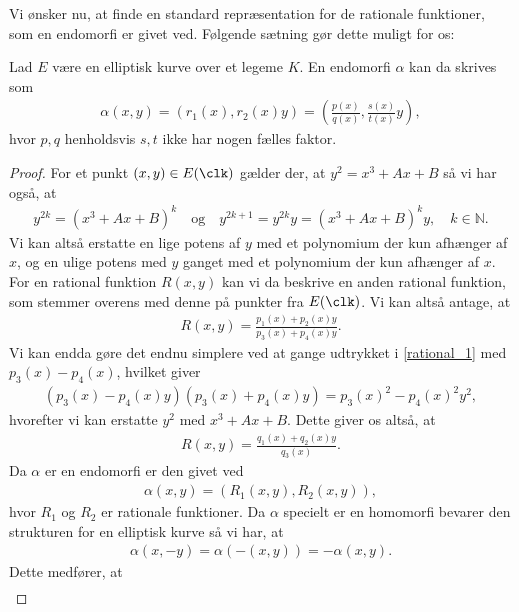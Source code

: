 Vi ønsker nu, at finde en standard repræsentation for de rationale funktioner, som en endomorfi er givet ved. Følgende sætning gør dette muligt for os:

\begin{thm}
\label{end_rep_theorem}
Lad $E$ være en elliptisk kurve over et legeme $K$. En endomorfi $\alpha$ kan da skrives som
\begin{align*}
	\alpha(x, y) = (r_1(x), r_2(x)y) = \left( \frac{p(x)}{q(x)}, \frac{s(x)}{t(x)}y \right),
\end{align*}
hvor $p, q$ henholdsvis $s, t$ ikke har nogen fælles faktor.
\end{thm}
\begin{proof}
For et punkt $(x, y) \in E(\clk)$ gælder der, at $y^2 = x^3 + Ax + B$ så vi har også, at 
\begin{align*}
	y^{2k} = (x^3 + Ax + B)^k \quad \text{og} \quad y^{2k+1}= y^{2k}y = (x^3 + Ax + B)^k y, \quad k \in \mathbb{N}.
\end{align*}
Vi kan altså erstatte en lige potens af $y$ med et polynomium der kun afhænger af $x$, og en ulige potens med $y$ ganget med et polynomium der kun afhænger af $x$. For en rational funktion $R(x, y)$ kan vi da beskrive en anden rational funktion, som stemmer overens med denne på punkter fra $E(\clk)$. Vi kan altså antage, at
\begin{align}
	\label{rational_1}
	R(x, y) = \frac{p_1(x) + p_2(x)y}{p_3(x)+p_4(x)y}.
\end{align}
Vi kan endda gøre det endnu simplere ved at gange udtrykket i \eqref{rational_1} med $p_3(x)-p_4(x)$, hvilket giver 
\begin{align*}
	(p_3(x) - p_4(x)y)(p_3(x)+p_4(x)y) = p_3(x)^2 - p_4(x)^2 y^2,
\end{align*}
hvorefter vi kan erstatte $y^2$ med $x^3 + Ax + B$. Dette giver os altså, at 
\begin{align}
	\label{rational_final}
	R(x, y) = \frac{q_1(x) + q_2(x)y}{q_3(x)}.
\end{align}
Da $\alpha$ er en endomorfi er den givet ved
\begin{align*}
	\alpha(x, y) = (R_1(x, y), R_2(x, y)),
\end{align*}
hvor $R_1$ og $R_2$ er rationale funktioner. Da $\alpha$ specielt er en homomorfi bevarer den strukturen for en elliptisk kurve så vi har, at
\begin{align*}
	\alpha(x, -y) = \alpha(-(x, y)) =  -\alpha(x, y).
\end{align*}
Dette medfører, at 
\begin{align*}

\end{align*}
\end{proof}
